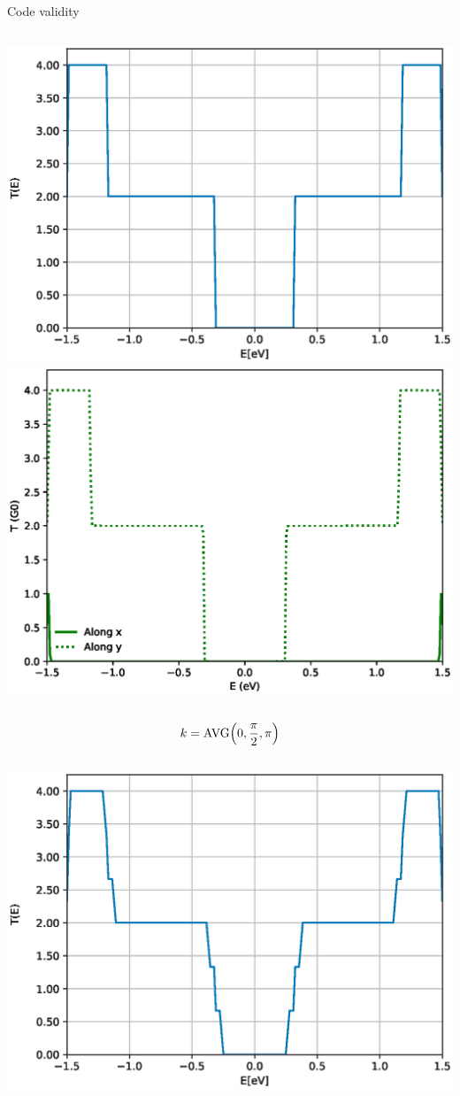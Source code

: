 \documentclass[hyperref={colorlinks=true,urlcolor=blue,linkcolor=.},aspectratio=1610,mathserif]{beamer}
\begin{document}
\begin{frame}{Code validity}
\begin{overprint}
\begin{columns}[t]
    \includegraphics[width=\textwidth]{Figures/NPGNormal_pi.eps}
    \includegraphics[width=.97\textwidth]{Figures/txy_pi.eps}
\end{columns}
\centering
\begin{align*}
		k = \mathrm{AVG}\pqty{0,\frac{\pi}{2},\pi}
\end{align*}
\begin{columns}[t]
    \includegraphics[width=\textwidth]{Figures/NPGNormal_AVER.eps}

\end{columns}
\end{overprint}
\end{frame}
\end{document}
